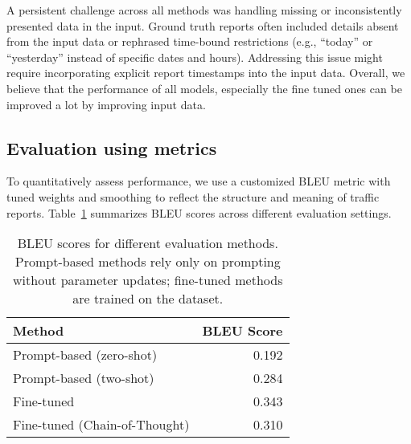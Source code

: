 \documentclass[fleqn,moreauthors,10pt]{ds_report}
\begin{document}
A persistent challenge across all methods was handling missing or inconsistently presented data in the input. Ground truth reports often included details absent from the input data or rephrased time-bound restrictions (e.g., “today” or “yesterday” instead of specific dates and hours). Addressing this issue might require incorporating explicit report timestamps into the input data. Overall, we believe that the performance of all models, especially the fine tuned ones can be improved a lot by improving input data.

\subsection*{Evaluation using metrics}

To quantitatively assess performance, we use a customized BLEU metric with tuned weights and smoothing to reflect the structure and meaning of traffic reports. Table~\ref{tab:bleu-results} summarizes BLEU scores across different evaluation settings.

\begin{table}[h]
\centering
\begin{tabular}{l r}
\toprule
\textbf{Method} & \textbf{BLEU Score} \\
\midrule
Prompt-based (zero-shot)              & 0.192 \\
Prompt-based (two-shot)               & 0.284 \\
Fine-tuned                            & 0.343 \\
Fine-tuned (Chain-of-Thought)         & 0.310 \\
\bottomrule
\end{tabular}
\caption{BLEU scores for different evaluation methods. Prompt-based methods rely only on prompting without parameter updates; fine-tuned methods are trained on the dataset.}
\label{tab:bleu-results}
\end{table}
\end{document}
